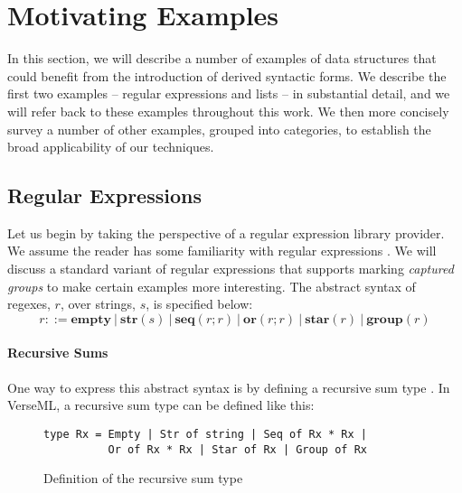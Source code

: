 
\section{Motivating Examples}\label{sec:motivating-examples}
In this section, we will describe a number of examples of data structures that could benefit from the introduction of  derived syntactic forms. We describe the first two examples -- regular expressions and lists -- in substantial detail, and we will refer back to these examples throughout this work. We then more concisely survey a number of other examples, grouped into  categories, to establish the broad applicability of our techniques. %

\subsection{Regular Expressions}\label{sec:syntax-examples-regexps}
Let us begin by taking the perspective of a regular expression library provider. We assume the reader has some familiarity with regular expressions \cite{Thompson:1968:PTR:363347.363387}. We will discuss a standard variant of regular expressions that supports marking \emph{captured groups} to make certain examples more interesting. The abstract syntax of {regexes}, $r$, over strings, $s$, is specified below:\[r ::= \textbf{empty} ~|~ \textbf{str}(s) ~|~ \textbf{seq}(r; r) ~|~ \textbf{or}(r; r) ~|~ \textbf{star}(r) ~|~ \textbf{group}(r)\]

\paragraph{Recursive Sums}
One way to express this abstract syntax is by defining a recursive sum type \cite{pfpl}. In VerseML, a recursive sum type can be defined like this:

\begin{figure}[ht]
\begin{lstlisting}[numbers=none]
type Rx = Empty | Str of string | Seq of Rx * Rx | 
          Or of Rx * Rx | Star of Rx | Group of Rx
\end{lstlisting}
\caption{Definition of the recursive sum type }
\label{fig:datatype-rx}
\end{figure}

